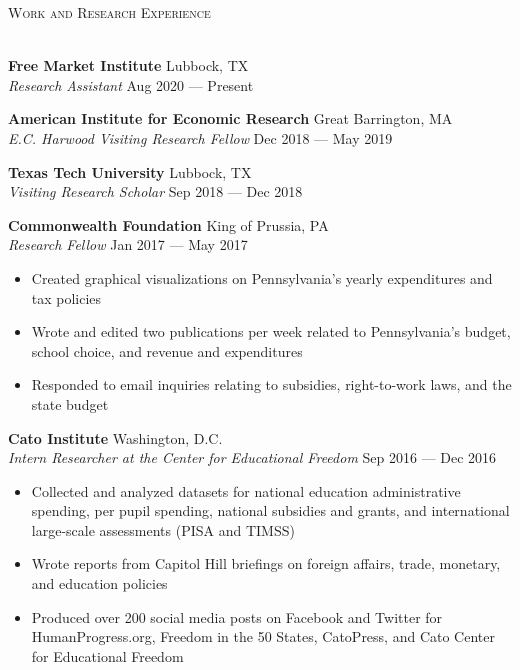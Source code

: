 \documentclass[a4paper,11pt]{article}
\newcommand{\lineunder} {
    \vspace*{-8pt} \\
    \hspace*{-18pt} \hrulefill \\
}
\newcommand{\header} [1] {
    {\hspace*{-18pt}\vspace*{6pt} \textsc{\large{#1}}}
    \vspace*{-6pt} \lineunder
}
\begin{document}
\header{Work and Research Experience}
\vspace{1mm}

\textbf{Free Market Institute} \hfill Lubbock, TX\\
\textit{Research Assistant} \hfill Aug 2020 --- Present \\
\vspace{1mm}

\textbf{American Institute for Economic Research} \hfill Great Barrington, MA\\
\textit{E.C. Harwood Visiting Research Fellow} \hfill Dec 2018 --- May 2019\\
\vspace{1mm}

\textbf{Texas Tech University} \hfill Lubbock, TX\\
\textit{Visiting Research Scholar} \hfill Sep 2018 --- Dec 2018\\
\vspace{1mm}

\textbf{Commonwealth Foundation} \hfill King of Prussia, PA\\
\textit{Research Fellow} \hfill Jan 2017 --- May 2017\\
\begin{itemize}[noitemsep,nolistsep]
	\item Created graphical visualizations on Pennsylvania’s yearly expenditures and tax policies
	\item Wrote and edited two publications per week related to Pennsylvania's budget, school choice, and revenue and expenditures
	\item Responded to email inquiries relating to subsidies, right-to-work laws, and the state budget
\end{itemize}
\vspace{1mm}

\textbf{Cato Institute} \hfill Washington, D.C.\\
\textit{Intern Researcher at the Center for Educational Freedom} \hfill Sep 2016 --- Dec 2016\\
\begin{itemize}[noitemsep,nolistsep]
	\item Collected and analyzed datasets for national education administrative spending, per pupil spending, national subsidies and grants, and international large-scale assessments (PISA and TIMSS)
	\item Wrote reports from Capitol Hill briefings on foreign affairs, trade, monetary, and education policies
	\item Produced over 200 social media posts on Facebook and Twitter for HumanProgress.org, Freedom in the 50 States, CatoPress, and Cato Center for Educational Freedom
\end{itemize}
\vspace{2mm}
\end{document}
